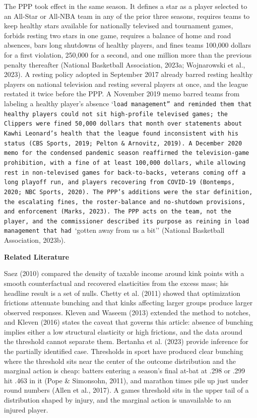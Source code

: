 \documentclass[12pt]{article}
\newcommand{\ltwo}[1]{\par\medskip\noindent\textbf{#1}\par\nopagebreak}
\begin{document}
The PPP took effect in the same season. It defines a star as a player selected to an All-Star or All-NBA team in any of the prior three seasons, requires teams to keep healthy stars available for nationally televised and tournament games, forbids resting two stars in one game, requires a balance of home and road absences, bars long shutdowns of healthy players, and fines teams 100,000 dollars for a first violation, 250,000 for a second, and one million more than the previous penalty thereafter (National Basketball Association, 2023a; Wojnarowski et al., 2023). A resting policy adopted in September 2017 already barred resting healthy players on national television and resting several players at once, and the league restated it twice before the PPP. A November 2019 memo barred teams from labeling a healthy player's absence `\texttt{load management'' and reminded them that healthy players could not sit high-profile televised games; the Clippers were fined 50,000 dollars that month over statements about Kawhi Leonard's health that the league found inconsistent with his status (CBS Sports, 2019; Pelton \& Arnovitz, 2019). A December 2020 memo for the condensed pandemic season reaffirmed the television-game prohibition, with a fine of at least 100,000 dollars, while allowing rest in non-televised games for back-to-backs, veterans coming off a long playoff run, and players recovering from COVID-19 (Bontemps, 2020; NBC Sports, 2020). The PPP's additions were the star definition, the escalating fines, the roster-balance and no-shutdown provisions, and enforcement (Marks, 2023). The PPP acts on the team, not the player, and the commissioner described its purpose as reining in load management that had }`gotten away from us a bit'' (National Basketball Association, 2023b).


\ltwo{Related Literature}


Saez (2010) compared the density of taxable income around kink points with a smooth counterfactual and recovered elasticities from the excess mass; his headline result is a set of nulls. Chetty et al. (2011) showed that optimization frictions attenuate bunching and that kinks affecting larger groups produce larger observed responses. Kleven and Waseem (2013) extended the method to notches, and Kleven (2016) states the caveat that governs this article: absence of bunching implies either a low structural elasticity or high frictions, and the data around the threshold cannot separate them. Bertanha et al. (2023) provide inference for the partially identified case. Thresholds in sport have produced clear bunching where the threshold sits near the center of the outcome distribution and the marginal action is cheap: batters entering a season's final at-bat at .298 or .299 hit .463 in it (Pope \& Simonsohn, 2011), and marathon times pile up just under round numbers (Allen et al., 2017). A games threshold sits in the upper tail of a distribution shaped by injury, and the marginal action is unavailable to an injured player.
\end{document}
